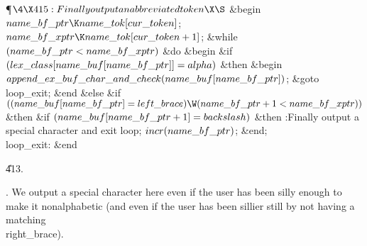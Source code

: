 \Y\P$\4\X415:Finally output an abbreviated token\X\S$\6
\&{begin} $\\{name\_bf\_ptr}\K\\{name\_tok}[\\{cur\_token}]$;\5
$\\{name\_bf\_xptr}\K\\{name\_tok}[\\{cur\_token}+1]$;\6
\&{while} $(\\{name\_bf\_ptr}<\\{name\_bf\_xptr})$ \1\&{do}\6
\&{begin} \&{if} $(\\{lex\_class}[\\{name\_buf}[\\{name\_bf\_ptr}]]=%
\\{alpha})$ \1\&{then}\6
\&{begin} $\\{append\_ex\_buf\_char\_and\_check}(\\{name\_buf}[\\{name\_bf%
\_ptr}])$;\5
\&{goto} \\{loop\_exit};\6
\&{end}\6
\4\&{else} \&{if} $((\\{name\_buf}[\\{name\_bf\_ptr}]=\\{left\_brace})\W(%
\\{name\_bf\_ptr}+1<\\{name\_bf\_xptr}))$ \1\&{then}\6
\&{if} $(\\{name\_buf}[\\{name\_bf\_ptr}+1]=\\{backslash})$ \1\&{then}\5
:Finally output a special character and exit loop\X;\2\2\2\6
$\\{incr}(\\{name\_bf\_ptr})$;\6
\&{end};\2\6
\4\\{loop\_exit}: \&{end}\par
\U413.\fi

.
We output a special character here even if the user has been silly
enough to make it nonalphabetic (and even if the user has been sillier
still by not having a matching \\{right\_brace}).

